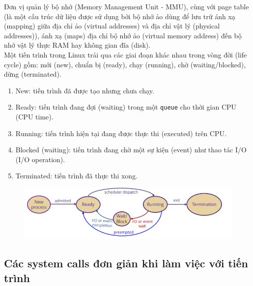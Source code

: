 \documentclass{article}
\begin{document}
Đơn vị quản lý bộ nhớ (Memory Management Unit - MMU), cùng với page table (là một cấu trúc dữ liệu được sử dụng bởi bộ nhớ ảo dùng để lưu trữ ánh xạ (mapping) giữa địa chỉ ảo (virtual addresses) và địa chỉ vật lý (physical addresses)), ánh xạ (maps) địa chỉ bộ nhớ ảo (virtual memory address) đến bộ nhớ vật lý thực RAM hay không gian đĩa (disk).
\\ Một tiến trình trong Linux trải qua các giai đoạn khác nhau trong vòng đời (life cycle) gồm: mới (new), chuẩn bị (ready), chạy (running), chờ (waiting/blocked), dừng (terminated).
\begin{enumerate}
    \item New: tiến trình đã được tạo nhưng chưa chạy.
    \item Ready: tiến trình đang đợi (waiting) trong một \verb|queue| cho thời gian CPU (CPU time).
    \item Running: tiến trình hiện tại đang được thực thi (executed) trên CPU.
    \item Blocked (waiting): tiến trình đang chờ một sự kiện (event) như thao tác I/O (I/O operation).
    \item Terminated: tiến trình đã thực thi xong.
\end{enumerate} 
\begin{figure}[h]
    \begin{center}
    \includegraphics[width=15cm]{3.png}
    \end{center}
    \end{figure}
\subsection{Các system calls đơn giản khi làm việc với tiến trình}
\end{document}
